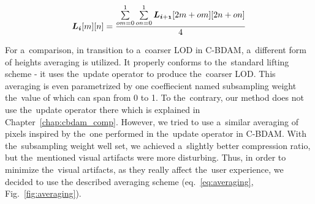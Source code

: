 \begin{equation}
\label{eq:averaging}
\lnorm{i}[m][n] = \frac{\sum\limits_{om=0}^{1}\sum\limits_{on=0}^{1}\lnorm{i+1}[2m + om][2n + on]}{4}
\end{equation}

For a~comparison, in transition to a~coarser LOD in C-BDAM, a~different form of heights averaging is utilized. It properly conforms to the~standard lifting scheme - it uses the~update operator to produce the~coarser LOD.  This averaging is even parametrized by one coeffiecient named subsampling weight the~value of which can span from 0 to 1. To the~contrary, our method does not use the~update operator there which is explained in Chapter~\ref{chap:cbdam_comp}. However, we tried to use a~similar averaging of pixels inspired by the~one performed in the~update operator in C-BDAM. With the~subsampling weight well set, we achieved a~slightly better compression ratio, but the~mentioned visual artifacts were more disturbing. Thus, in order to minimize the~visual artifacts, as they really affect the~user experience, we decided to use the described averaging scheme (eq.~\ref{eq:averaging}, Fig.~\ref{fig:averaging}).

\newcommand{\vspacemip}[0]{\vspace{0.08cm}}

